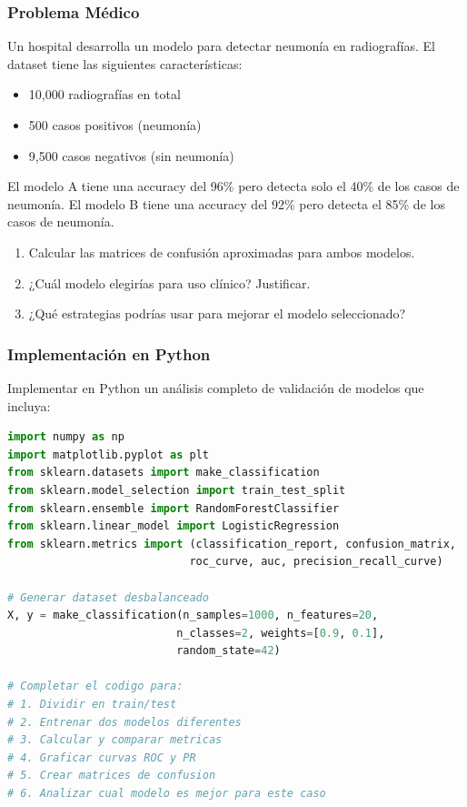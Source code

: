 \documentclass[12pt]{article}
\begin{document}
\subsubsection{Problema Médico}

Un hospital desarrolla un modelo para detectar neumonía en radiografías. El dataset tiene las siguientes características:
\begin{itemize}
    \item 10,000 radiografías en total
    \item 500 casos positivos (neumonía)
    \item 9,500 casos negativos (sin neumonía)
\end{itemize}

El modelo A tiene una accuracy del 96\% pero detecta solo el 40\% de los casos de neumonía.
El modelo B tiene una accuracy del 92\% pero detecta el 85\% de los casos de neumonía.

\begin{enumerate}
    \item[a.] Calcular las matrices de confusión aproximadas para ambos modelos.
    \item[b.] ¿Cuál modelo elegirías para uso clínico? Justificar.
    \item[c.] ¿Qué estrategias podrías usar para mejorar el modelo seleccionado?
\end{enumerate}

\subsubsection{Implementación en Python}

Implementar en Python un análisis completo de validación de modelos que incluya:

\begin{lstlisting}[language=Python]
import numpy as np
import matplotlib.pyplot as plt
from sklearn.datasets import make_classification
from sklearn.model_selection import train_test_split
from sklearn.ensemble import RandomForestClassifier
from sklearn.linear_model import LogisticRegression
from sklearn.metrics import (classification_report, confusion_matrix, 
                            roc_curve, auc, precision_recall_curve)

# Generar dataset desbalanceado
X, y = make_classification(n_samples=1000, n_features=20, 
                          n_classes=2, weights=[0.9, 0.1], 
                          random_state=42)

# Completar el codigo para:
# 1. Dividir en train/test
# 2. Entrenar dos modelos diferentes
# 3. Calcular y comparar metricas
# 4. Graficar curvas ROC y PR
# 5. Crear matrices de confusion
# 6. Analizar cual modelo es mejor para este caso
\end{lstlisting}
\end{document}
